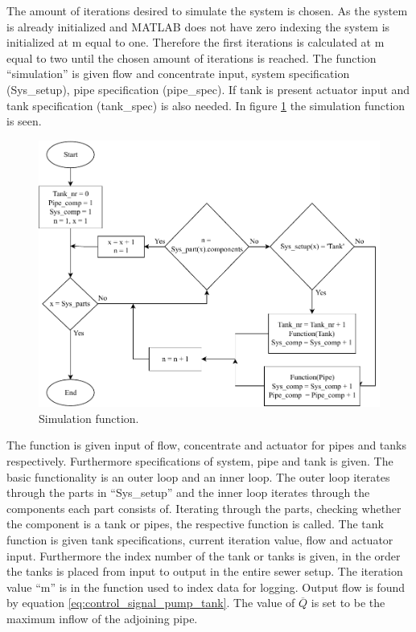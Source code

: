 The amount of iterations desired to simulate the system is chosen. As the system is already initialized and MATLAB does not have zero indexing the system is initialized at m equal to one. Therefore the first iterations is calculated at m equal to two until the chosen amount of iterations is reached. The function ``simulation'' is given flow and concentrate input, system specification (Sys\_setup), pipe specification (pipe\_spec). If tank is present actuator input and tank specification (tank\_spec) is also needed.
In figure \ref{fig:simu_chart} the simulation function is seen.
\begin{figure}[H]
\centering
\includegraphics[width=0.9 \textwidth]{report/simulation/pictures/simu_chart.pdf}
\caption{Simulation function.}
\label{fig:simu_chart}
\end{figure}

The function is given input of flow, concentrate and actuator for pipes and tanks respectively. Furthermore specifications of system, pipe and tank is given. The basic functionality is an outer loop and an inner loop. The outer loop iterates through the parts in ``Sys\_setup'' and the inner loop iterates through the components each part consists of. Iterating through the parts, checking whether the component is a tank or pipes, the respective function is called. The tank function is given tank specifications, current iteration value, flow and actuator input. Furthermore the index number of the tank or tanks is given, in the order the tanks is placed from input to output in the entire sewer setup. The iteration value ``m'' is in the function used to index data for logging. 
Output flow is found by equation \ref{eq:control_signal_pump_tank}. The value of $\overline Q$ is set to be the maximum inflow of the adjoining pipe. 

